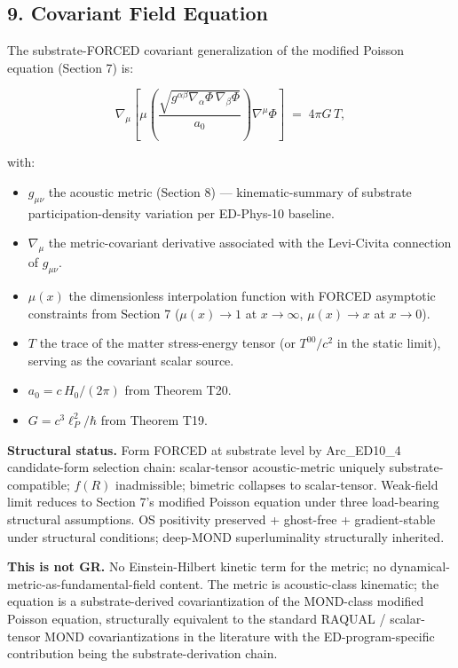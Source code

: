 \documentclass[
]{article}
\providecommand{\tightlist}{%
  \setlength{\itemsep}{0pt}\setlength{\parskip}{0pt}}
\begin{document}
\subsection{9. Covariant Field Equation}\label{covariant-field-equation}

The substrate-FORCED covariant generalization of the modified Poisson
equation (Section 7) is:

\[\boxed{\;\nabla_\mu\!\left[\mu\!\left(\frac{\sqrt{g^{\alpha\beta}\nabla_\alpha\Phi\,\nabla_\beta\Phi}}{a_0}\right)\nabla^\mu\Phi\right] \;=\; 4\pi G\,T,\;}\]

with:

\begin{itemize}
\tightlist
\item
  \(g_{\mu\nu}\) the acoustic metric (Section 8) --- kinematic-summary
  of substrate participation-density variation per ED-Phys-10 baseline.
\item
  \(\nabla_\mu\) the metric-covariant derivative associated with the
  Levi-Civita connection of \(g_{\mu\nu}\).
\item
  \(\mu(x)\) the dimensionless interpolation function with FORCED
  asymptotic constraints from Section 7 (\(\mu(x) \to 1\) at
  \(x \to \infty\), \(\mu(x) \to x\) at \(x \to 0\)).
\item
  \(T\) the trace of the matter stress-energy tensor (or \(T^{00}/c^2\)
  in the static limit), serving as the covariant scalar source.
\item
  \(a_0 = c\,H_0/(2\pi)\) from Theorem T20.
\item
  \(G = c^3\ell_P^2/\hbar\) from Theorem T19.
\end{itemize}

\textbf{Structural status.} Form FORCED at substrate level by
Arc\_ED10\_4 candidate-form selection chain: scalar-tensor
acoustic-metric uniquely substrate-compatible; \(f(R)\) inadmissible;
bimetric collapses to scalar-tensor. Weak-field limit reduces to Section
7's modified Poisson equation under three load-bearing structural
assumptions. OS positivity preserved + ghost-free + gradient-stable
under structural conditions; deep-MOND superluminality structurally
inherited.

\textbf{This is not GR.} No Einstein-Hilbert kinetic term for the
metric; no dynamical-metric-as-fundamental-field content. The metric is
acoustic-class kinematic; the equation is a substrate-derived
covariantization of the MOND-class modified Poisson equation,
structurally equivalent to the standard RAQUAL / scalar-tensor MOND
covariantizations in the literature with the ED-program-specific
contribution being the substrate-derivation chain.
\end{document}
